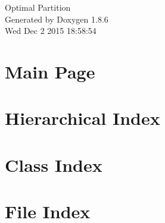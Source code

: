 \documentclass[twoside]{book}
\newcommand{\clearemptydoublepage}{%
  \newpage{\pagestyle{empty}\cleardoublepage}%
}
\begin{document}
\hypersetup{pageanchor=false}
\begin{titlepage}
\vspace*{7cm}
\begin{center}%
{\Large Optimal Partition }\\
\vspace*{1cm}
{\large Generated by Doxygen 1.8.6}\\
\vspace*{0.5cm}
{\small Wed Dec 2 2015 18:58:54}\\
\end{center}
\end{titlepage}
\clearemptydoublepage
\tableofcontents
\clearemptydoublepage
{}
\hypersetup{pageanchor=true}

\chapter{Main Page}
\label{index}\hypertarget{index}{}
\chapter{Hierarchical Index}

\chapter{Class Index}

\chapter{File Index}

\end{document}
